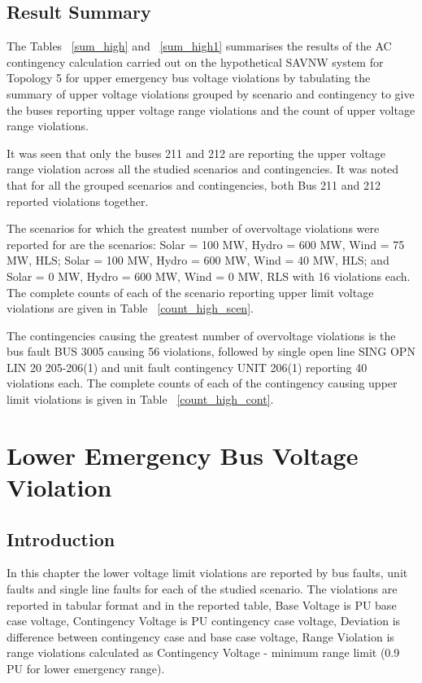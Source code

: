 \documentclass[10pt]{report}
\begin{document}
\section{Result Summary}
The Tables ~\ref{sum_high} and  ~\ref{sum_high1} summarises the results of the AC contingency calculation carried out on the hypothetical SAVNW system for Topology 5 for upper emergency bus voltage violations by tabulating the summary of upper voltage violations grouped by scenario and contingency to give the buses reporting upper voltage range violations and the count of upper voltage range violations.

It was seen that only the buses 211 and 212 are reporting the upper voltage range violation across all the studied scenarios and contingencies. It was noted that for all the grouped scenarios and contingencies, both Bus 211 and 212 reported violations together. 

The scenarios for which the greatest number of overvoltage violations were reported for are the scenarios: Solar = 100 MW, Hydro = 600 MW, Wind = 75 MW, HLS; Solar = 100 MW, Hydro = 600 MW, Wind = 40 MW, HLS; and Solar = 0 MW, Hydro = 600 MW, Wind = 0 MW, RLS with 16 violations each. The complete counts of each of the scenario reporting upper limit voltage violations are given in Table ~\ref{count_high_scen}. 

The contingencies causing the greatest number of overvoltage violations is the bus fault BUS 3005 causing 56 violations, followed by single open line SING OPN LIN 20 205-206(1) and unit fault contingency UNIT 206(1) reporting 40 violations each. The complete counts of each of the contingency causing upper limit violations is given in Table ~\ref{count_high_cont}.



\chapter{Lower Emergency Bus Voltage Violation}
\label{lower}
\section{Introduction}
In this chapter the lower voltage limit violations are reported by bus faults, unit faults and single line faults for each of the studied scenario.
The violations are reported in tabular format and in the reported table, Base Voltage is PU base case voltage, Contingency Voltage is PU contingency case voltage, Deviation is difference between contingency case and base case voltage, Range Violation is range violations calculated as Contingency Voltage - minimum range limit (0.9 PU for lower emergency range).
\end{document}
